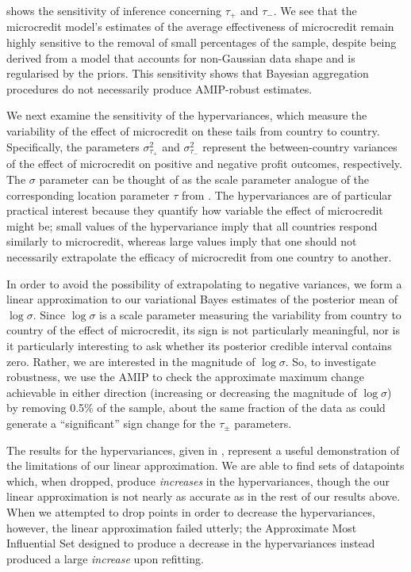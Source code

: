 \MicrocreditMixtureResultsTable{}
%
\MicrocreditMixtureSdResultsTable{}

 shows the sensitivity of inference concerning
$\tau_{+}$ and $\tau_{-}$.  We see that the microcredit model's estimates of the
average effectiveness of microcredit remain highly sensitive to the removal of
small percentages of the sample, despite being derived from a model that
accounts for non-Gaussian data shape and is regularised by the priors. This
sensitivity shows that Bayesian aggregation procedures do not necessarily
produce AMIP-robust estimates.

We next examine the sensitivity of the hypervariances, which measure the
variability of the effect of microcredit on these tails from country to country.  Specifically,
the parameters $\sigma_{\tau_{+}}^2$ and $\sigma_{\tau_{-}}^2$ represent the
between-country variances of the effect of microcredit on positive and negative
profit outcomes, respectively. The $\sigma$ parameter can be thought of as the
scale parameter analogue of the corresponding location parameter $\tau$ from
. The hypervariances are of particular practical
interest because they quantify how variable the effect of microcredit might
be; small values of the hypervariance imply that all countries respond
similarly to microcredit, whereas large values imply that one should not
necessarily extrapolate the efficacy of microcredit from one country to another.

In order to avoid the possibility of extrapolating to negative variances, we form
a linear approximation to our variational Bayes estimates of the posterior mean
of $\log \sigma$.  Since $\log \sigma$ is a scale parameter measuring the
variability from country to country of the effect of microcredit, its sign is
not particularly meaningful, nor is it particularly interesting to ask whether
its posterior credible interval contains zero.  Rather, we are interested in the
magnitude of $\log \sigma$. So, to investigate robustness, we use the AMIP to
check the approximate maximum change achievable in either direction (increasing
or decreasing the magnitude of $\log \sigma$) by removing 0.5\% of the sample,
about the same fraction of the data as could generate a ``significant'' sign
change for the $\tau_{\pm}$ parameters.

The results for the hypervariances, given in ,
represent a useful demonstration of the limitations of our linear approximation.
We are able to find sets of datapoints which, when dropped, produce {\em
increases} in the hypervariances, though the our linear approximation is not
nearly as accurate as in the rest of our results above. When we attempted to
drop points in order to decrease the hypervariances, however, the linear
approximation failed utterly; the Approximate Most Influential Set designed to
produce a decrease in the hypervariances instead produced a large {\em
increase} upon refitting.


